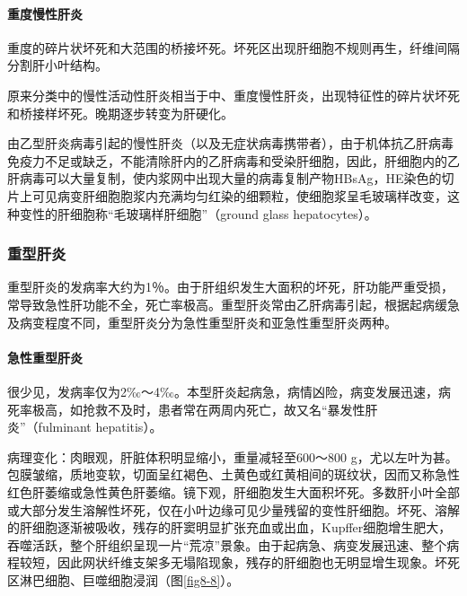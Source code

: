 \paragraph{重度慢性肝炎}
重度的碎片状坏死和大范围的桥接坏死。坏死区出现肝细胞不规则再生，纤维间隔分割肝小叶结构。

原来分类中的慢性活动性肝炎相当于中、重度慢性肝炎，出现特征性的碎片状坏死和桥接样坏死。晚期逐步转变为肝硬化。

由乙型肝炎病毒引起的慢性肝炎（以及无症状病毒携带者），由于机体抗乙肝病毒免疫力不足或缺乏，不能清除肝内的乙肝病毒和受染肝细胞，因此，肝细胞内的乙肝病毒可以大量复制，使内浆网中出现大量的病毒复制产物HBsAg，HE染色的切片上可见病变肝细胞胞浆内充满均匀红染的细颗粒，使细胞浆呈毛玻璃样改变，这种变性的肝细胞称“毛玻璃样肝细胞”（ground
glass hepatocytes）。

\subsubsection{重型肝炎}

重型肝炎的发病率大约为1％。由于肝组织发生大面积的坏死，肝功能严重受损，常导致急性肝功能不全，死亡率极高。重型肝炎常由乙肝病毒引起，根据起病缓急及病变程度不同，重型肝炎分为急性重型肝炎和亚急性重型肝炎两种。

\paragraph{急性重型肝炎}
很少见，发病率仅为2‰～4‰。本型肝炎起病急，病情凶险，病变发展迅速，病死率极高，如抢救不及时，患者常在两周内死亡，故又名“暴发性肝炎”（fulminant
hepatitis）。

病理变化：肉眼观，肝脏体积明显缩小，重量减轻至600～800
g，尤以左叶为甚。包膜皱缩，质地变软，切面呈红褐色、土黄色或红黄相间的斑纹状，因而又称急性红色肝萎缩或急性黄色肝萎缩。镜下观，肝细胞发生大面积坏死。多数肝小叶全部或大部分发生溶解性坏死，仅在小叶边缘可见少量残留的变性肝细胞。坏死、溶解的肝细胞逐渐被吸收，残存的肝窦明显扩张充血或出血，Kupffer细胞增生肥大，吞噬活跃，整个肝组织呈现一片“荒凉”景象。由于起病急、病变发展迅速、整个病程较短，因此网状纤维支架多无塌陷现象，残存的肝细胞也无明显增生现象。坏死区淋巴细胞、巨噬细胞浸润（图\ref{fig8-8}）。

